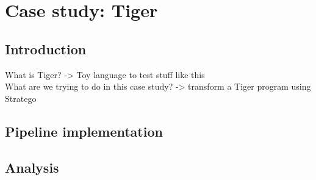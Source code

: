 \chapter{\label{chap:tiger}Case study: Tiger}

\section{\label{sec:tiger__introduction}Introduction}
What is Tiger?
-> Toy language to test stuff like this
\\
What are we trying to do in this case study?
-> transform a Tiger program using Stratego

\section{\label{sec:tiger__implementation}Pipeline implementation}


\section{\label{sec:tiger__analysis}Analysis}

